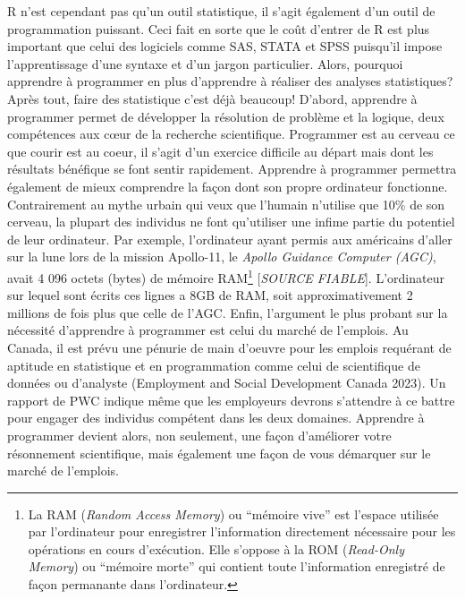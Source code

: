 \documentclass[
  letterpaper,
  DIV=11,
  numbers=noendperiod]{scrreprt}
\begin{document}
R n'est cependant pas qu'un outil statistique, il s'agit également d'un
outil de programmation puissant. Ceci fait en sorte que le coût d'entrer
de R est plus important que celui des logiciels comme SAS, STATA et SPSS
puisqu'il impose l'apprentissage d'une syntaxe et d'un jargon
particulier. Alors, pourquoi apprendre à programmer en plus d'apprendre
à réaliser des analyses statistiques? Après tout, faire des statistique
c'est déjà beaucoup! D'abord, apprendre à programmer permet de
développer la résolution de problème et la logique, deux compétences aux
cœur de la recherche scientifique. Programmer est au cerveau ce que
courir est au coeur, il s'agit d'un exercice difficile au départ mais
dont les résultats bénéfique se font sentir rapidement. Apprendre à
programmer permettra également de mieux comprendre la façon dont son
propre ordinateur fonctionne. Contrairement au mythe urbain qui veux que
l'humain n'utilise que 10\% de son cerveau, la plupart des individus ne
font qu'utiliser une infime partie du potentiel de leur ordinateur. Par
exemple, l'ordinateur ayant permis aux américains d'aller sur la lune
lors de la mission Apollo-11, le \emph{Apollo Guidance Computer (AGC)},
avait 4 096 octets (bytes) de mémoire RAM\footnote{La RAM (\emph{Random
  Access Memory}) ou ``mémoire vive'' est l'espace utilisée par
  l'ordinateur pour enregistrer l'information directement nécessaire
  pour les opérations en cours d'exécution. Elle s'oppose à la ROM
  (\emph{Read-Only Memory}) ou ``mémoire morte'' qui contient toute
  l'information enregistré de façon permanante dans l'ordinateur.}
{[}\emph{SOURCE FIABLE}{]}. L'ordinateur sur lequel sont écrits ces
lignes a 8GB de RAM, soit approximativement 2 millions de fois plus que
celle de l'AGC. Enfin, l'argument le plus probant sur la nécessité
d'apprendre à programmer est celui du marché de l'emplois. Au Canada, il
est prévu une pénurie de main d'oeuvre pour les emplois requérant de
aptitude en statistique et en programmation comme celui de scientifique
de données ou d'analyste (Employment and Social Development Canada
2023). Un rapport de PWC indique même que les employeurs devrons
s'attendre à ce battre pour engager des individus compétent dans les
deux domaines. Apprendre à programmer devient alors, non seulement, une
façon d'améliorer votre résonnement scientifique, mais également une
façon de vous démarquer sur le marché de l'emplois.
\end{document}
